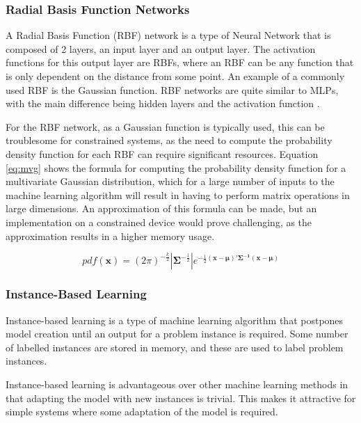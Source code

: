 \subsubsection{Radial Basis Function Networks}
A Radial Basis Function (RBF) network is a type of Neural Network that is composed of 2 layers, an input layer and an output layer. The activation functions for this output layer are RBFs, where an RBF can be any function that is only dependent on the distance from some point. An example of a commonly used RBF is the Gaussian function. RBF networks are quite similar to MLPs, with the main difference being hidden layers and the activation function \cite{broomhead1988radial}.

For the RBF network, as a Gaussian function is typically used, this can be troublesome for constrained systems, as the need to compute the probability density function for each RBF can require significant resources. Equation \ref{eq:mvg} shows the formula for computing the probability density function for a multivariate Gaussian distribution, which for a large number of inputs to the machine learning algorithm will result in having to perform matrix operations in large dimensions. An approximation of this formula can be made, but an implementation on a constrained device would prove challenging, as the approximation results in a higher memory usage.

\begin{equation}
	pdf(\mathbf{x}) = (2\pi)^{-\frac{k}{2}}|\mathbf{\Sigma}^{-\frac{1}{2}}|e^{-\frac{1}{2}(\mathbf{x}-\mathbf{\mu})'\mathbf{\Sigma^{-1}}(\mathbf{x}-\mathbf{\mu})}
	\label{eq:mvg}
\end{equation}

\subsubsection{Instance-Based Learning}
Instance-based learning is a type of machine learning algorithm that postpones model creation until an output for a problem instance is required. Some number of labelled instances are stored in memory, and these are used to label problem instances.

Instance-based learning is advantageous over other machine learning methods in that adapting the model with new instances is trivial. This makes it attractive for simple systems where some adaptation of the model is required.

